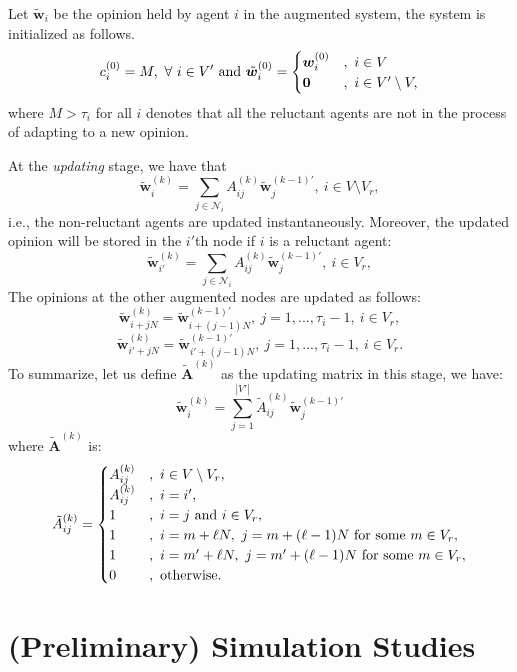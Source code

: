 \documentclass[letter]{article}
\theoremstyle{t}
\begin{document}
Let $\tilde{ \bm w}_i$ be the opinion held by agent $i$ in the augmented system, the system is initialized as follows.
\[
c_i^{(0)} = M,~\forall~ i \in V'~{\rm and}~\tilde{ \bm w}_i^{(0)} = \begin{cases} { \bm w}_i^{(0)} &,~i \in V \\
 {\bf 0} &,~i \in V' \setminus V, \end{cases}
\]
where $M > \tau_i$ for all $i$ denotes that all the reluctant agents are not in the process of adapting to a new opinion. 

At the \emph{updating} stage, we have that 
\[
\tilde{\bm w}_i^{(k)} = \sum_{j \in \mathcal{N}_i} A_{ij}^{(k)} \tilde{\bm w}_j^{(k-1)'},~i \in V \setminus V_r,
\]
i.e., the non-reluctant agents are updated instantaneously. Moreover, the updated opinion will be stored in the $i'$th node if $i$ is a reluctant agent:
\[
\tilde{\bm w}_{i'}^{(k)} = \sum_{j \in \mathcal{N}_i} A_{ij}^{(k)} \tilde{\bm w}_j^{(k-1)'},~i \in  V_r,
\]
The opinions at the other augmented nodes are updated as follows:
\[
\tilde{\bm w}_{i+j N}^{(k)} = \tilde{\bm w}_{i + (j-1)N}^{(k-1)'},~j=1,...,\tau_i - 1,~i \in V_r,
\]
\[
\tilde{\bm w}_{i' +j N}^{(k)} = \tilde{\bm w}_{i' + (j-1)N}^{(k-1)'},~j=1,...,\tau_i - 1,~i \in V_r.
\]
To summarize, let us define $\tilde{\bm A}^{(k)}$ as the updating matrix in this stage, we have:
\[
\tilde{\bm w}_i^{(k)} = \sum_{j=1}^{|V'|} \tilde{A}_{ij}^{(k)} \tilde{\bm w}_j^{(k-1)'}
\]
where $\tilde{\bm A}^{(k)}$ is:
\begin{equation} \label{eq:a_update}
\tilde{A}_{ij}^{(k)} = \begin{cases}
A_{ij}^{(k)} &,~i \in V \setminus V_r, \\
A_{ij}^{(k)} &,~i = i', \\
1 &,~i = j~{\rm and}~i \in V_r,\\
1 &,~i = m + \ell N,~j=m + (\ell-1) N~{\rm for~some}~m \in V_r, \\
1 &,~i = m' + \ell N,~j=m' + (\ell-1) N~{\rm for~some}~m \in V_r, \\
0 &,~{\rm otherwise}.
\end{cases}
\end{equation}

\section{(Preliminary) Simulation Studies}
\end{document}
